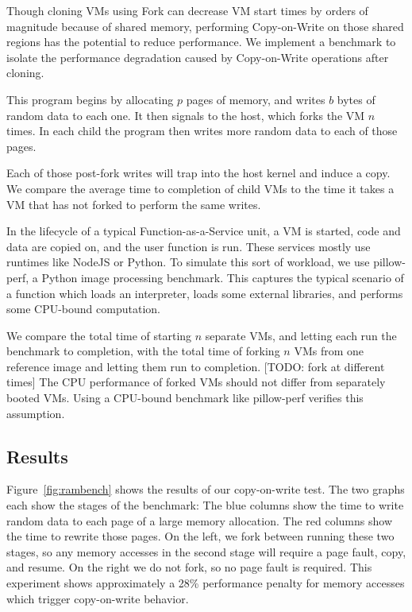 Though cloning VMs using Fork can decrease VM start times by orders of
magnitude because of shared memory, performing Copy-on-Write on those shared
regions has the potential to reduce performance. We implement a benchmark to
isolate the performance degradation caused by Copy-on-Write operations after
cloning.

This program begins by allocating $p$ pages of memory, and writes $b$ bytes of
random data to each one. It then signals to the host, which forks the VM $n$
times. In each child the program then writes more random data to each of those
pages.

Each of those post-fork writes will trap into the host kernel and induce a
copy. We compare the average time to completion of child VMs to the time it
takes a VM that has not forked to perform the same writes.


In the lifecycle of a typical Function-as-a-Service unit, a VM is started, code
and data are copied on, and the user function is run. These services mostly use
runtimes like NodeJS or Python. To simulate this sort of workload, we use
pillow-perf, a Python image processing benchmark. This captures the typical
scenario of a function which loads an interpreter, loads some external
libraries, and performs some CPU-bound computation.

We compare the total time of starting $n$ separate VMs, and letting each run
the benchmark to completion, with the total time of forking $n$ VMs from one
reference image and letting them run to completion. [TODO: fork at different
times] The CPU performance of forked VMs should not differ from separately
booted VMs. Using a CPU-bound benchmark like pillow-perf verifies this
assumption.

\subsection{Results}



Figure~\ref{fig:rambench} shows the results of our copy-on-write test. The two
graphs each show the stages of the benchmark: The blue columns show the time to
write random data to each page of a large memory allocation. The red columns
show the time to rewrite those pages. On the left, we fork between running
these two stages, so any memory accesses in the second stage will require a
page fault, copy, and resume. On the right we do not fork, so no page fault is
required. This experiment shows approximately a 28\% performance penalty for
memory accesses which trigger copy-on-write behavior.

